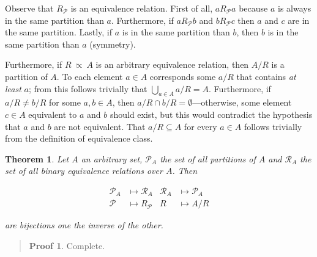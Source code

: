 \documentclass[a4paper, 12pt]{article}
\newtheorem{theorem}{Theorem}
\theoremstyle{definition}
\theoremstyle{definition}
\theoremstyle{definition}
\newtheorem{pro}{Proof}
\begin{document}
Observe that $R_{\mathcal{P}}$ is an equivalence relation. First of all,
$aR_{\mathcal{P}}a$ because $a$ is always in the same partition than $a$.
Furthermore, if $aR_{\mathcal{P}}b$ and $bR_{\mathcal{P}}c$ then $a$ and $c$ are
in the same partition. Lastly, if $a$ is in the same partition than $b$, then
$b$ is in the same partition than $a$ (symmetry).

Furthermore, if $R ~ \ddot{\propto} ~A$ is an arbitrary equivalence relation, then $A
/ R$ is a partition of $A$. To each element $a \in A$ corresponds some $a / R$
that contains \textit{at least} $a$; from this follows trivially that
$\bigcup_{a \in A} a / R = A$. Furthermore, if $a / R \neq b / R$ for some $a, b
\in  A$, then $a / R \cap b / R = \emptyset$---otherwise, some element $c \in A$
equivalent to $a$ and $b$ should exist, but this would contradict the hypothesis
that $a$ and $b$ are not equivalent. That $a / R \subseteq A$ for every $a \in
A$ follows trivially from the definition of equivalence class.

\begin{theorem}
    Let $A$ an arbitrary set, $\mathscr{P}_A$ the set of all partitions of $A$
    and $\mathscr{R}_A$ the set of all binary equivalence relations over $A$.
    Then 

    \begin{align*}
        \mathscr{P}_A &\mapsto \mathscr{R}_A &\mathscr{R}_A  &\mapsto \mathscr{P}_A \\ 
        \mathcal{P} &\mapsto R_{\mathcal{P}} & R &\mapsto A / R
    \end{align*}


    are bijections one the inverse of the other.
\end{theorem}


\small
\begin{quote}

\begin{pro}
    Complete.
\end{pro}

\end{quote}
\normalsize
\end{document}
